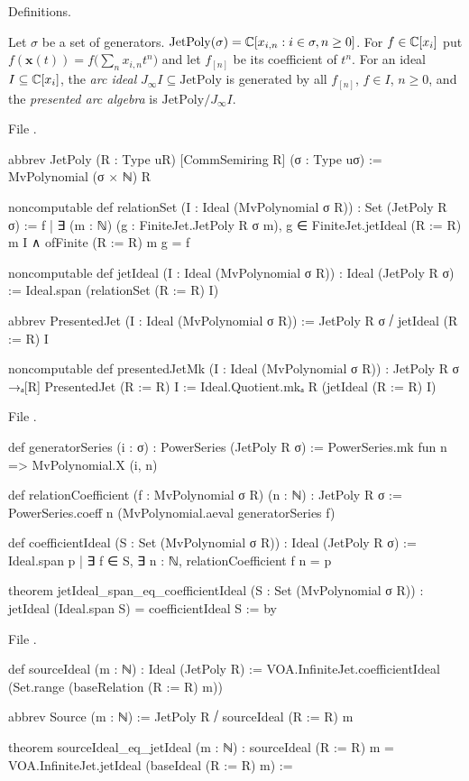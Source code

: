 \begin{status}
Definitions.
\end{status}

\begin{definition}\label{l20:def:jet}
Let $\sigma$ be a set of generators. $\mathrm{JetPoly}(\sigma)={\mathbb{C}}[x_{i,n}: i\in\sigma,n\ge0]$. For $f\in{\mathbb{C}}[x_i]$
put $f(\mathbf x(t))=f\bigl(\sum_nx_{i,n}t^n\bigr)$ and let $f_{[n]}$ be its coefficient of $t^n$. For an ideal
$I\subseteq{\mathbb{C}}[x_i]$, the \emph{arc ideal} $J_\infty I\subseteq\mathrm{JetPoly}$ is generated by all
$f_{[n]}$, $f\in I$, $n\ge0$, and the \emph{presented arc algebra} is $\mathrm{JetPoly}/J_\infty I$.
\end{definition}
\noindent File .
\begin{leancode}
abbrev JetPoly (R : Type uR) [CommSemiring R] (σ : Type uσ) :=
  MvPolynomial (σ × ℕ) R

noncomputable def relationSet (I : Ideal (MvPolynomial σ R)) : Set (JetPoly R σ) :=
  {f | ∃ (m : ℕ) (g : FiniteJet.JetPoly R σ m),
    g ∈ FiniteJet.jetIdeal (R := R) m I ∧ ofFinite (R := R) m g = f}

noncomputable def jetIdeal (I : Ideal (MvPolynomial σ R)) : Ideal (JetPoly R σ) :=
  Ideal.span (relationSet (R := R) I)

abbrev PresentedJet (I : Ideal (MvPolynomial σ R)) :=
  JetPoly R σ ⧸ jetIdeal (R := R) I

noncomputable def presentedJetMk (I : Ideal (MvPolynomial σ R)) :
    JetPoly R σ →ₐ[R] PresentedJet (R := R) I :=
  Ideal.Quotient.mkₐ R (jetIdeal (R := R) I)
\end{leancode}
\noindent File .
\begin{leancode}
def generatorSeries (i : σ) : PowerSeries (JetPoly R σ) :=
  PowerSeries.mk fun n => MvPolynomial.X (i, n)

def relationCoefficient (f : MvPolynomial σ R) (n : ℕ) : JetPoly R σ :=
  PowerSeries.coeff n (MvPolynomial.aeval generatorSeries f)

def coefficientIdeal (S : Set (MvPolynomial σ R)) : Ideal (JetPoly R σ) :=
  Ideal.span {p | ∃ f ∈ S, ∃ n : ℕ, relationCoefficient f n = p}

theorem jetIdeal_span_eq_coefficientIdeal (S : Set (MvPolynomial σ R)) :
    jetIdeal (Ideal.span S) = coefficientIdeal S := by
\end{leancode}
\noindent File .
\begin{leancode}
def sourceIdeal (m : ℕ) : Ideal (JetPoly R) :=
  VOA.InfiniteJet.coefficientIdeal (Set.range (baseRelation (R := R) m))

abbrev Source (m : ℕ) := JetPoly R ⧸ sourceIdeal (R := R) m

theorem sourceIdeal_eq_jetIdeal (m : ℕ) :
    sourceIdeal (R := R) m = VOA.InfiniteJet.jetIdeal (baseIdeal (R := R) m) :=
\end{leancode}

